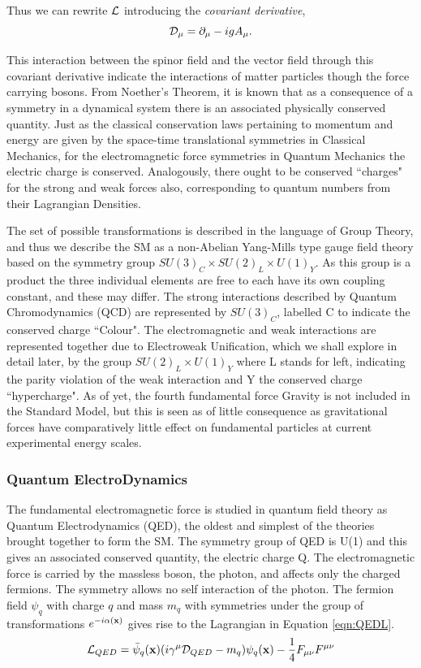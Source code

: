Thus we can rewrite ${\mathcal{L}}$ introducing the \textit{covariant derivative}, 
\begin{equation}
{\mathcal{D}}_{\mu} = \partial_{\mu} - igA_{\mu}. 
\end{equation}

This interaction between the spinor field and the vector field through this covariant derivative indicate the interactions of matter particles though the force carrying bosons. From Noether's Theorem, it is known that as a consequence of a symmetry in a dynamical system there is an associated physically conserved quantity\cite{Rolnick}. Just as the classical conservation laws pertaining to momentum and energy are given by the space-time translational symmetries in Classical Mechanics, for the electromagnetic force symmetries in Quantum Mechanics the electric charge is conserved. Analogously, there ought to be conserved ``charges" for the strong and weak forces also, corresponding to quantum numbers from their Lagrangian Densities. 
 
The set of possible transformations is described in the language of Group Theory, and thus we describe the SM as a non-Abelian Yang-Mills type gauge field theory based on the symmetry group $SU(3)_{C} \times SU(2)_{L} \times U(1)_{Y}$. As this group is a product the three individual elements are free to each have its own coupling constant, and these may differ. The strong interactions described by Quantum Chromodynamics (QCD) are represented by $SU(3)_{C}$, labelled C to indicate the conserved charge ``Colour". The electromagnetic and weak interactions are represented together due to Electroweak Unification, which we shall explore in detail later, by the group $SU(2)_L \times U(1)_{Y}$ where L stands for left, indicating the parity violation of the weak interaction and Y the conserved charge ``hypercharge". As of yet, the fourth fundamental force Gravity is not included in the Standard Model, but this is seen as of little consequence as gravitational forces have comparatively little effect on fundamental particles at current experimental energy scales. 

\subsubsection{Quantum ElectroDynamics}

The fundamental electromagnetic force is studied in quantum field theory as Quantum Electrodynamics (QED), the oldest and simplest of the theories brought together to form the SM. The symmetry group of QED is U(1) and this gives an associated conserved quantity, the electric charge Q. The electromagnetic force is carried by the massless boson, the photon, and affects only the charged fermions. The symmetry allows no self interaction of the photon. The fermion field $\psi_{q}$ with charge $q$ and mass $m_{q}$ with symmetries under the group of transformations $e^{-i\alpha(\mathbf{x})}$ gives rise to the Lagrangian in Equation \ref{eqn:QEDL}.
\begin{equation}
{\mathcal{L}}_{QED} = \bar{\psi}_{q}(\mathbf{x})(i \gamma^{\mu}\mathcal{D}_{QED} - m_{q}) \psi_{q}(\mathbf{x}) - \frac{1}{4}F_{\mu \nu}F^{\mu \nu}
\label{eqn:QEDL}
\end{equation}

